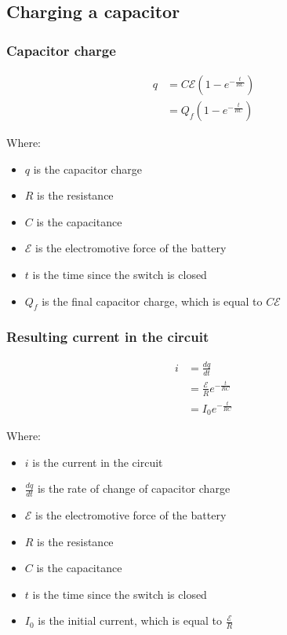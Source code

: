 \documentclass[11pt]{article}
\begin{document}
\newpage
\subsection{Charging a capacitor}
\label{sec:orgfa693e4}

\subsubsection{Capacitor charge}
\label{sec:org08ba575}
\begin{align*}
q &= C \mathcal{E} (1 - e^{- \frac{t}{RC}}) \\
&= Q_f(1 - e^{-\frac{t}{RC}})
\end{align*}

Where:
\begin{itemize}
\item \(q\) is the capacitor charge
\item \(R\) is the resistance
\item \(C\) is the capacitance
\item \(\mathcal{E}\) is the electromotive force of the battery
\item \(t\) is the time since the switch is closed
\item \(Q_f\) is the final capacitor charge, which is equal to \(C \mathcal{E}\)
\end{itemize}
\subsubsection{Resulting current in the circuit}
\label{sec:org995abe4}
\begin{align*}
i &= \frac{dq}{dt} \\
&= \frac{\mathcal{E}}{R} e^{-\frac{t}{RC}} \\
&= I_0 e^{-\frac{t}{RC}}
\end{align*}

Where:
\begin{itemize}
\item \(i\) is the current in the circuit
\item \(\frac{dq}{dt}\) is the rate of change of capacitor charge
\item \(\mathcal{E}\) is the electromotive force of the battery
\item \(R\) is the resistance
\item \(C\) is the capacitance
\item \(t\) is the time since the switch is closed
\item \(I_0\) is the initial current, which is equal to \(\frac{\mathcal{E}}{R}\)
\end{itemize}
\end{document}
